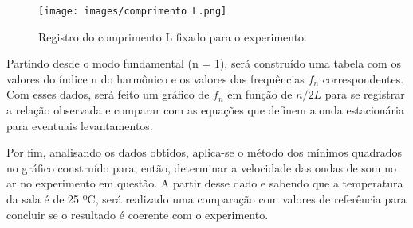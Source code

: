 \begin{figure}[H]
  \centering
  \texttt{[image: images/comprimento L.png]}
  \caption{ Registro do comprimento L fixado para o experimento.}
\end{figure}

Partindo desde o modo fundamental (n = 1), será construído uma tabela com os valores do índice n do harmônico e os valores das frequências $f_n$ correspondentes. Com esses dados, será feito um gráfico de $f_n$ em função de $n/2L$ para se registrar a relação observada e comparar com as equações que definem a onda estacionária para eventuais levantamentos.

Por fim, analisando os dados obtidos, aplica-se o método dos mínimos quadrados no gráfico construído para, então, determinar a velocidade das ondas de som no ar no experimento em questão. A partir desse dado e sabendo que a temperatura da sala é de 25 ºC,  será realizado uma comparação com valores de referência para concluir se o resultado é coerente com o experimento.